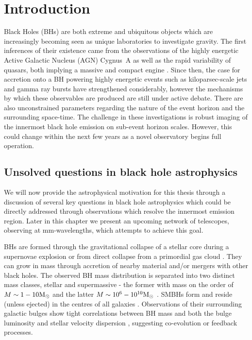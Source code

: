 \chapter{Introduction}
Black Holes (BHs) are both extreme and ubiquitous objects which are increasingly becoming seen as unique laboratories to investigate gravity. The first inferences of their existence came from the observations of the highly energetic Active Galactic Nucleus (AGN) Cygnus~A as well as the rapid variability of quasars, both implying a massive and compact engine \citep[e.g.][and references therein]{Narayan_2013}. Since then, the case for accretion onto a BH powering highly energetic events such as kiloparsec-scale jets and gamma ray bursts have strengthened considerably, however the mechanisms by which these observables are produced are still under active debate. There are also unconstrained parameters regarding the nature of the event horizon and the surrounding space-time. The challenge in these investigations is robust imaging of the innermost black hole emission on sub-event horizon scales. However, this could change within the next few years as a novel observatory begins full operation.

\section{Unsolved questions in black hole astrophysics}\label{sec:unsolved_qs}

We will now provide the astrophysical motivation for this thesis through a discussion of several key questions in black hole astrophysics which could be directly addressed through observations which resolve the innermost emission region. Later in this chapter we present an upcoming network of telescopes, observing at mm-wavelengths, which attempts to achieve this goal. 


BHs are formed through the gravitational collapse of a stellar core during a supernovae explosion or from direct collapse from a primordial gas cloud \citep[e.g.][]{Begelman_2006}. They can grow in mass through accretion of nearby material and/or mergers with other black holes. The observed BH mass distribution is separated into two distinct mass classes, stellar and supermassive - the former with mass on the order of $M \sim 1 - 10 {\rm M_\odot}$ and the latter $M \sim 10^6 - 10^{10} {\rm M_\odot}$ \citep{Falcke_2013}. SMBHs form and reside (unless ejected) in the centres of all galaxies \citep{Kormendy_1995}. Observations of their surrounding galactic bulges show tight correlations between BH mass and both the bulge luminosity and stellar velocity dispersion \citep[e.g.][]{Magorrian_1998,Gebhardt_2000}, suggesting co-evolution or feedback processes. 


